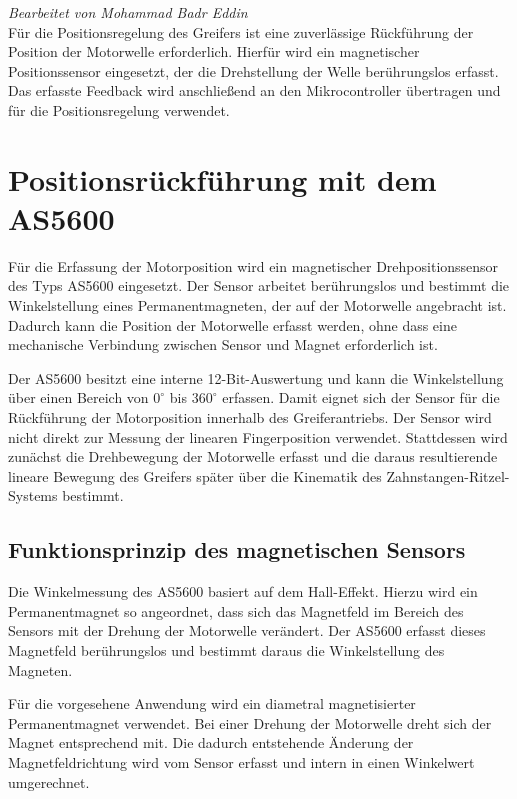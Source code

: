

\textit{Bearbeitet von Mohammad Badr Eddin}\\

Für die Positionsregelung des Greifers ist eine zuverlässige Rückführung
der Position der Motorwelle erforderlich. Hierfür wird ein magnetischer
Positionssensor eingesetzt, der die Drehstellung der Welle berührungslos
erfasst. Das erfasste Feedback wird anschließend an den Mikrocontroller
übertragen und für die Positionsregelung verwendet.

\section{Positionsrückführung mit dem AS5600}
\label{sec:encoder}

Für die Erfassung der Motorposition wird ein magnetischer
Drehpositionssensor des Typs AS5600 eingesetzt. Der Sensor arbeitet
berührungslos und bestimmt die Winkelstellung eines Permanentmagneten,
der auf der Motorwelle angebracht ist. Dadurch kann die Position der
Motorwelle erfasst werden, ohne dass eine mechanische Verbindung
zwischen Sensor und Magnet erforderlich ist.

Der AS5600 besitzt eine interne 12-Bit-Auswertung und kann die
Winkelstellung über einen Bereich von $0^\circ$ bis $360^\circ$
erfassen. Damit eignet sich der Sensor für die Rückführung der
Motorposition innerhalb des Greiferantriebs. Der Sensor wird
nicht direkt zur Messung der linearen Fingerposition verwendet.
Stattdessen wird zunächst die Drehbewegung der Motorwelle erfasst und
die daraus resultierende lineare Bewegung des Greifers später über die
Kinematik des Zahnstangen-Ritzel-Systems bestimmt.


\subsection{Funktionsprinzip des magnetischen Sensors}

Die Winkelmessung des AS5600 basiert auf dem Hall-Effekt. Hierzu wird
ein Permanentmagnet so angeordnet, dass sich das Magnetfeld im Bereich
des Sensors mit der Drehung der Motorwelle verändert. Der AS5600
erfasst dieses Magnetfeld berührungslos und bestimmt daraus die
Winkelstellung des Magneten.

Für die vorgesehene Anwendung wird ein diametral magnetisierter
Permanentmagnet verwendet. Bei einer Drehung der Motorwelle dreht sich
der Magnet entsprechend mit. Die dadurch entstehende Änderung der
Magnetfeldrichtung wird vom Sensor erfasst und intern in einen
Winkelwert umgerechnet.

